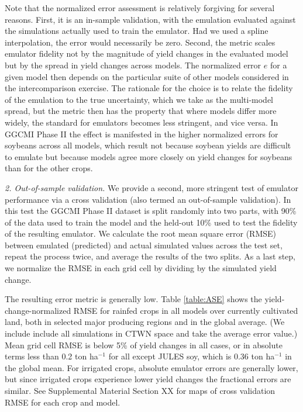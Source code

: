 \documentclass[gmd, manuscript]{copernicus} %
\begin{document}
Note that the normalized error assessment is relatively forgiving for several reasons. 
First, it is an in-sample validation, with the emulation evaluated against the simulations actually used to train the emulator. 
Had we used a spline interpolation, the error would necessarily be zero. 
Second, the metric scales emulator fidelity not by the magnitude of yield changes in the evaluated model but by the spread in yield changes across models. 
The normalized error $e$ for a given model then depends on the particular suite of other models considered in the intercomparison exercise.  
The rationale for the choice is to relate the fidelity of the emulation to the true uncertainty, which we take as the multi-model spread, but  
the metric then has the property that where models differ more widely, the standard for emulators becomes less stringent, and vice versa.
In GGCMI Phase II the effect is manifested in the higher normalized errors for soybeans across all models, which result not because soybean yields are difficult to emulate but because models agree more closely on yield changes for soybeans than for the other crops.

\smallskip
\label{S:4.2}
\textit{2. Out-of-sample validation.} 
We provide a second, more stringent test of emulator performance via a cross validation (also termed an out-of-sample validation). 
In this test the GGCMI Phase II dataset is split randomly into two parts, with 90\% of the data used to train the model and the held-out 10\% used to test the fidelity of the resulting emulator.
We calculate the root mean square error (RMSE) between emulated (predicted) and actual simulated values across the test set, repeat the process twice, and average the results of the two splits. 
As a last step, we normalize the RMSE in each grid cell by dividing by the simulated yield change. %

The resulting error metric is generally low. %
Table \ref{table:ASE} shows the yield-change-normalized RMSE for rainfed crops in all models over currently cultivated land, both in selected major producing regions and in the global average. (We include include all simulations in CTWN space and take the average error value.) 
Mean grid cell RMSE is below 5\% of yield changes in all cases, or in absolute terms 
less than 0.2 ton ha$^{-1}$ for all except JULES soy, which is 0.36 ton ha$^{-1}$ in the global mean.
For irrigated crops, absolute emulator errors are generally lower, but since irrigated crops experience lower yield changes the fractional errors are similar. 
See Supplemental Material Section XX for maps of cross validation RMSE for each crop and model.
\end{document}
